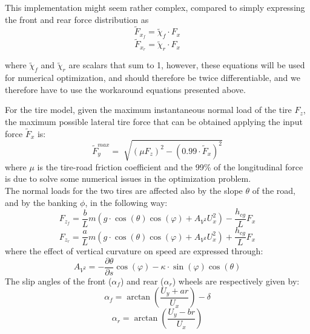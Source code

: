 \documentclass[a4paper, onecolumn, 12pt]{article}
\begin{document}
This implementation might seem rather complex, compared to simply expressing the front and rear force distribution as
\begin{equation}
    \tilde{F}_{x_f} = \tilde{\chi}_f \cdot F_x
\end{equation}
\begin{equation}
    \tilde{F}_{x_r} = \tilde{\chi}_r \cdot F_x
\end{equation}

where $\tilde{\chi}_f$ and $\tilde{\chi}_r$ are scalars that sum to 1, however, these equations will be used for numerical 
optimization, and should therefore be twice differentiable, and we therefore have to use the workaround equations presented above.

For the tire model, given the maximum instantaneous normal load of the tire $F_z$, the maximum possible
lateral tire force that can be obtained applying the input force $\tilde{F}_x$ is:
\begin{equation}
    \tilde{F}_y^{max} = \sqrt[]{(\mu F_z)^2 - (0.99\cdot \tilde{F}_x)^2}
\end{equation}
where $\mu$ is the tire-road friction coefficient and the 99\%  of the longitudinal force is due to solve 
some numerical issues in the optimization problem. \\
The normal loads for the two tires are affected also by the slope $\theta$ of the road, and by the banking $\phi$, in the following way:
\begin{equation}
    \label{normalF}
    F_{z_f} = \frac{b}{L}m(g\cdot \cos(\theta)\cos(\varphi)+A_{V^2}U_x^2)-\frac{h_{cg}}{L}F_x
\end{equation}
\begin{equation}
    \label{normalR}
    F_{z_r} = \frac{a}{L}m(g\cdot \cos(\theta)\cos(\varphi)+A_{V^2}U_x^2)+\frac{h_{cg}}{L}F_x
\end{equation}
where the effect of vertical curvature on speed are expressed through:
\begin{equation}
    A_{V^2} = -\frac{\partial \theta}{\partial s}\cos(\varphi)-\kappa\cdot \sin(\varphi)\cos(\theta) 
\end{equation}
The slip angles of the front ($\alpha_f$) and rear ($\alpha_r$) wheels are respectively given by:
\begin{equation}
    \alpha_f = \arctan \left(\frac{U_y+ar}{U_x}\right)-\delta
\end{equation}
\begin{equation}
    \alpha_r = \arctan \left(\frac{U_y-br}{U_x}\right)
\end{equation}
\end{document}
